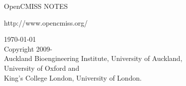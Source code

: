 \thispagestyle{empty}

\begin{center}
   \huge OpenCMISS NOTES
   \vspace{10mm}   

   \large http://www.opencmiss.org/
   \vspace{10mm}   

   \begin{figure}[htbp] \centering
   \end{figure} %
   \vspace{10mm}   

   \vspace{5mm}
   \today\\   %
   \vspace{20mm}
   \small
   \textcopyright \thickspace Copyright 2009-\\
   Auckland Bioengineering Institute, University of Auckland, \\
   University of Oxford and \\
   King's College London, University of London.
\end{center}





